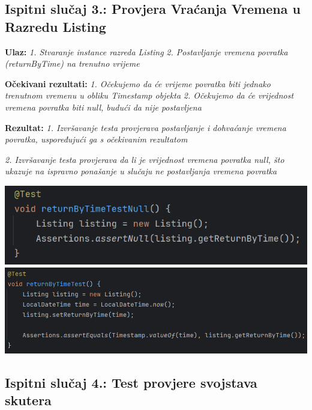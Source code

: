 			\subsection{Ispitni slučaj 3.: Provjera Vraćanja Vremena u Razredu Listing}

                                                \textbf{Ulaz:}
                                                \textit{1. Stvaranje instance razreda Listing}
                                                \textit{2. Postavljanje vremena povratka (returnByTime) na trenutno vrijeme}

                                                \textbf{Očekivani rezultati:}
                                                \textit{1. Očekujemo da će vrijeme povratka biti jednako trenutnom vremenu u obliku Timestamp objekta}
                                                \textit{2. Očekujemo da će vrijednost vremena povratka biti null, budući da nije postavljena}


                                                \textbf{Rezultat:}
                                                \textit{1. Izvršavanje testa provjerava postavljanje i dohvaćanje vremena povratka, uspoređujući ga s očekivanim rezultatom}

                                                \textit{2. Izvršavanje testa provjerava da li je vrijednost vremena povratka null, što ukazuje na ispravno ponašanje u slučaju ne postavljanja vremena povratka}

            \includegraphics[width=1\linewidth]{slike/ListingTest.png}
            \includegraphics[width=1\linewidth]{slike/ListingTest1.png}

			\subsection{Ispitni slučaj 4.: Test provjere svojstava skutera}

